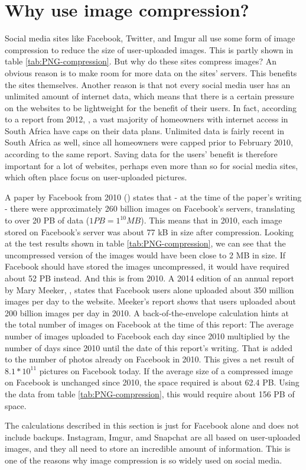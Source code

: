 \section{Why use image compression?}
Social media sites like Facebook, Twitter, and Imgur all use some form of image compression to reduce the size of user-uploaded images.
This is partly shown in table \ref{tab:PNG-compression}.
But why do these sites compress images?
An obvious reason is to make room for more data on the sites' servers.
This benefits the sites themselves.
Another reason is that not every social media user has an unlimited amount of internet data, which means that there is a certain pressure on the websites to be lightweight for the benefit of their users.
In fact, according to a report from 2012, \citep{chetty_2012}, a vast majority of homeowners with internet access in South Africa have caps on their data plans.
Unlimited data is fairly recent in South Africa as well, since all homeowners were capped prior to February 2010, according to the same report.
Saving data for the users' benefit is therefore important for a lot of websites, perhaps even more than so for social media sites, which often place focus on user-uploaded pictures.

A paper by Facebook from 2010 (\citep{beaver2010}) states that - at the time of the paper's writing - there were approximately 260 billion images on Facebook's servers, translating to over 20 PB of data ($1 PB = 1^{10} MB$).
This means that in 2010, each image stored on Facebook's server was about 77 kB in size after compression.
Looking at the test results shown in table \ref{tab:PNG-compression}, we can see that the uncompressed version of the images would have been close to 2 MB in size.
If Facebook should have stored the images uncompressed, it would have required about 52 PB instead.
And this is from 2010.
A 2014 edition of an annual report by Mary Meeker, \citep{meeker2014internet}, states that Facebook users alone uploaded about
350 million images per day to the website.
Meeker's report shows that users uploaded about 200 billion images per day in 2010.
A back-of-the-envelope calculation hints at the total number of images on Facebook at the time of this report:
The average number of images uploaded to Facebook each day since 2010 multiplied by the number of days since 2010 until the date of this report's writing.
That is added to the number of photos already on Facebook in 2010.
This gives a net result of $8.1*10^{11}$ pictures on Facebook today.
If the average size of a compressed image on Facebook is unchanged since 2010, the space required is about 62.4 PB.
Using the data from table \ref{tab:PNG-compression}, this would require about 156 PB of space.

The calculations described in this section is just for Facebook alone and does not include backups. Instagram, Imgur, amd Snapchat are all based on user-uploaded images, and they all need to store an incredible amount of information.
This is one of the reasons why image compression is so widely used on social media.

